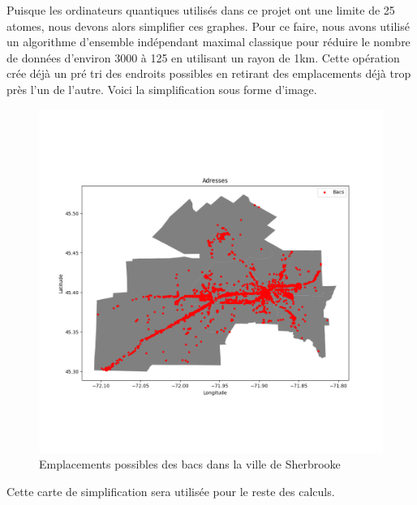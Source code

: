 \documentclass[11pt]{article}
\begin{document}
Puisque les ordinateurs quantiques utilisés dans ce projet ont une limite de 25 atomes, nous devons alors simplifier ces graphes. Pour ce faire, nous avons utilisé un algorithme d'ensemble indépendant maximal classique pour réduire le nombre de données d'environ 3000 à 125 en utilisant un rayon de 1km. Cette opération crée déjà un pré tri des endroits possibles en retirant des emplacements déjà trop près l'un de l'autre. Voici la simplification sous forme d'image. 

 \begin{figure}[H]
    \centering
        \includegraphics[width=0.5\linewidth]{images/commerces.png}
        \caption{Emplacements possibles des bacs dans la ville de Sherbrooke}
    \label{bacs_possibles_total}
\end{figure}


Cette carte de simplification sera utilisée pour le reste des calculs.
\end{document}

